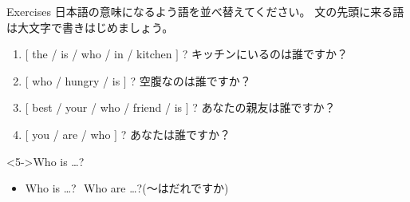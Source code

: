 \documentclass[aspectratio=169]{beamer}
\begin{document}
\begin{frame}[plain]{Exercises}
日本語の意味になるよう語を並べ替えてください。
文の先頭に来る語は大文字で書きはじめましょう。

 \begin{enumerate}
  \item  $[$ the / is / who / in / kitchen $]$ ? キッチンにいるのは誰ですか？\\
  \item  $[$ who / hungry / is $]$ ? 空腹なのは誰ですか？\\
  \item  $[$ best / your / who / friend / is $]$ ? あなたの親友は誰ですか？\\
  \item  $[$ you / are / who $]$ ? あなたは誰ですか？\\
\end{enumerate}

\begin{block}<5->{Who is \ldots{}?}
 \begin{itemize}
  \item Who is \ldots{}?\,\, Who are \ldots{}?(～はだれですか)\mbox{}\hfill{}

 \end{itemize}
\end{block}
\end{frame}
\end{document}
